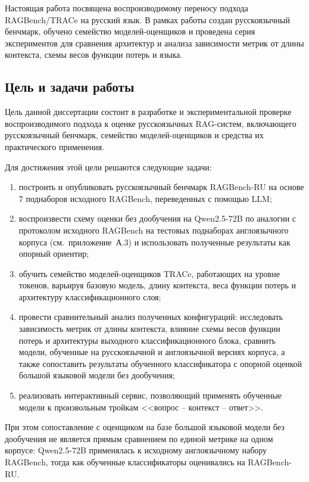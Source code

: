 Настоящая работа посвящена воспроизводимому переносу
подхода RAGBench/TRACe на русский язык.
В рамках работы создан русскоязычный бенчмарк,
обучено семейство моделей-оценщиков и проведена
серия экспериментов для сравнения архитектур и анализа
зависимости метрик от длины контекста, схемы весов функции потерь и языка.


\subsection*{Цель и задачи работы}

Цель данной диссертации состоит в разработке и экспериментальной проверке воспроизводимого
подхода к оценке русскоязычных RAG-систем, включающего русскоязычный бенчмарк, семейство
моделей-оценщиков и средства их практического применения.

Для достижения этой цели решаются следующие задачи:

\begin{enumerate}
  \item построить и опубликовать русскоязычный бенчмарк RAGBench-RU на основе 7
  поднаборов исходного RAGBench, переведенных с помощью LLM;

  \item воспроизвести схему оценки без дообучения на Qwen2.5-72B по аналогии
  с протоколом исходного RAGBench на тестовых поднаборах англоязычного
  корпуса (см.~приложение~А.3) и использовать полученные результаты как
  опорный ориентир;

  \item обучить семейство моделей-оценщиков TRACe, работающих на уровне токенов,
варьируя базовую модель, длину контекста, веса функции потерь и архитектуру
классификационного слоя;

  \item провести сравнительный анализ полученных конфигураций: исследовать
  зависимость метрик от длины контекста, влияние схемы весов функции потерь и
  архитектуры выходного классификационного блока, сравнить модели, обученные на
  русскоязычной и англоязычной версиях корпуса, а также сопоставить результаты
  обученного классификатора с опорной оценкой большой языковой модели без дообучения;

  \item реализовать интерактивный сервис, позволяющий применять обученные модели к
  произвольным тройкам <<вопрос -- контекст -- ответ>>.
\end{enumerate}
При этом сопоставление с оценщиком на базе большой языковой модели без дообучения
не является прямым сравнением по единой метрике на одном корпусе:
Qwen2.5-72B применялась к исходному англоязычному набору RAGBench,
тогда как обученные классификаторы оценивались на RAGBench-RU.


